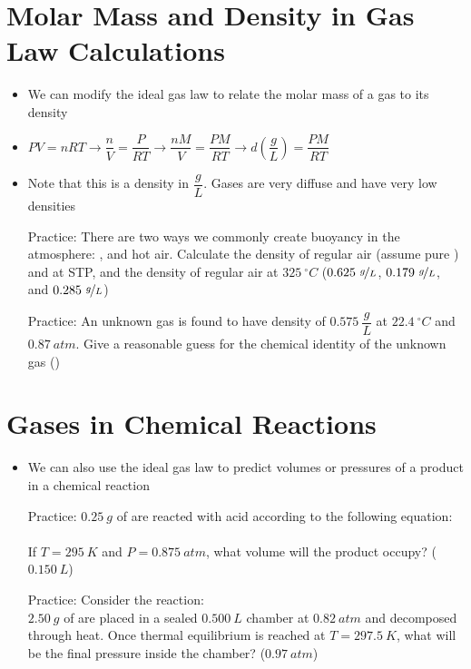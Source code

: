 \documentclass[12pt, openany, letterpaper]{memoir}
\begin{document}
\section{Molar Mass and Density in Gas Law Calculations}
\begin{itemize}
	\item We can modify the ideal gas law to relate the molar mass of a gas to its density
	\item $PV=nRT \rightarrow \dfrac{n}{V}=\dfrac{P}{RT} \rightarrow \dfrac{nM}{V} = \dfrac{PM}{RT} \rightarrow d\left(\dfrac{g}{L}\right)=\dfrac{PM}{RT}$
	\item Note that this is a density in $\dfrac{g}{L}$. Gases are very diffuse and have very low densities
	
	Practice: There are two ways we commonly create buoyancy in the atmosphere: , and hot air. Calculate the density of regular air (assume pure ) and  at STP, and the density of regular air at $325~^\circ C$ ($0.625~\nicefrac{g}{L}$, $0.179~\nicefrac{g}{L}$, and $0.285~\nicefrac{g}{L}$)
	
	Practice: An unknown gas is found to have density of $0.575~\dfrac{g}{L}$ at $22.4~^\circ C$ and $0.87~atm$. Give a reasonable guess for the chemical identity of the unknown gas ()
	
\end{itemize}
\section{Gases in Chemical Reactions}
\begin{itemize}
	\item We can also use the ideal gas law to predict volumes or pressures of a product in a chemical reaction
	
	Practice: $0.25~g$ of  are reacted with acid according to the following equation:\\
	\\
	If $T=295~K$ and $P=0.875~atm$, what volume will the  product occupy? ($0.150~L$)
	
	Practice: Consider the reaction: \\
	$2.50~g$ of  are placed in a sealed $0.500~L$ chamber at $0.82~atm$ and decomposed through heat. Once thermal equilibrium is reached at $T=297.5~K$, what will be the final pressure inside the chamber? ($0.97~atm$)
\end{itemize}
\end{document}
